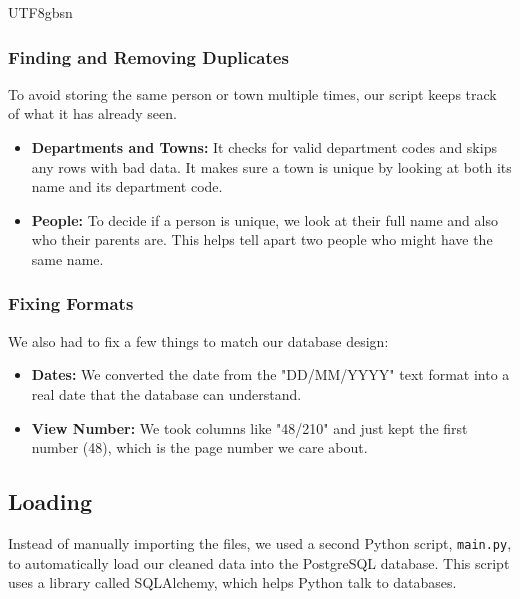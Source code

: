 \documentclass[11pt]{report}
\begin{document}
\begin{CJK*}{UTF8}{gbsn}
    \subsubsection{Finding and Removing Duplicates}
    To avoid storing the same person or town multiple times, our script keeps track of what it has already seen.
    \begin{itemize}
        \item \textbf{Departments and Towns:} It checks for valid department codes and skips any rows with bad data. It makes sure a town is unique by looking at both its name and its department code.
        \item \textbf{People:} To decide if a person is unique, we look at their full name and also who their parents are. This helps tell apart two people who might have the same name.
    \end{itemize}

    \subsubsection{Fixing Formats}
    We also had to fix a few things to match our database design:
    \begin{itemize}
        \item \textbf{Dates:} We converted the date from the "DD/MM/YYYY" text format into a real date that the database can understand.
        \item \textbf{View Number:} We took columns like "48/210" and just kept the first number (48), which is the page number we care about.
    \end{itemize}

    \subsection{Loading}
    Instead of manually importing the files, we used a second Python script, \texttt{main.py}, to automatically load our cleaned data into the PostgreSQL database. This script uses a library called SQLAlchemy, which helps Python talk to databases.


\end{CJK*}
\end{document}
